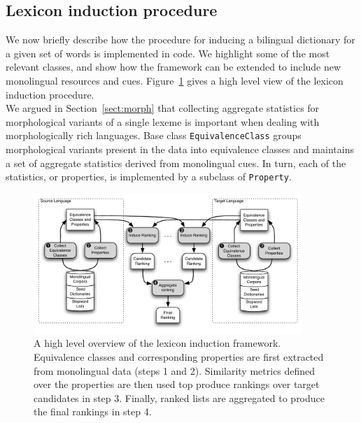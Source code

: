 \documentclass{article}
\newcommand{\secref}[1]{Section~\ref{#1}}
\newcommand{\figref}[1]{Figure~\ref{#1}}
\begin{document}
\subsection{Lexicon induction procedure}

We now briefly describe how the procedure for inducing a bilingual dictionary for a given set of words is implemented in code.  We highlight some of the most relevant classes, and show how the framework can be extended to include new monolingual resources and cues.  \figref{fig:system} gives a high level view of the lexicon induction procedure.\\


We argued in \secref{sect:morph} that collecting aggregate statistics for morphological variants of a single lexeme is important when dealing with morphologically rich languages.   Base class \small{\tt EquivalenceClass} groups morphological variants present in the data into equivalence classes and maintains a set of aggregate statistics derived from monolingual cues.  In turn, each of the statistics, or properties, is implemented by a subclass of \small{\tt Property}. \\

\begin{figure}[h!]
\centerline{\mbox{\includegraphics[width=4in]{figures/lexinduct}}}
\caption{A high level overview of the lexicon induction framework.  Equivalence classes and corresponding properties are first extracted from monolingual data (steps 1 and 2).  Similarity metrics defined over the properties are then used top produce rankings over target candidates in step 3.  Finally, ranked lists are aggregated to produce the final rankings in step 4.}
\label{fig:system}
\end{figure}
\end{document}
